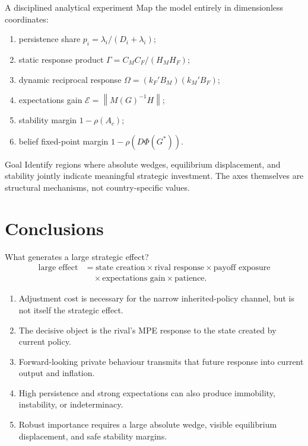 \documentclass[10pt,aspectratio=169]{beamer}
\newcommand{\norm}[1]{\left\lVert#1\right\rVert}
\begin{document}
\begin{frame}{A disciplined analytical experiment}
Map the model entirely in dimensionless coordinates:
\begin{enumerate}
  \item persistence share $p_i=\lambda_i/(D_i+\lambda_i)$;
  \item static response product $\Gamma=C_MC_F/(H_MH_F)$;
  \item dynamic reciprocal response $\Omega=(k_F'B_M)(k_M'B_F)$;
  \item expectations gain $\mathcal E=\norm{M(G)^{-1}H}$;
  \item stability margin $1-\rho(A_c)$;
  \item belief fixed-point margin $1-\rho(D\Phi(G^*))$.
\end{enumerate}
\begin{exampleblock}{Goal}
Identify regions where absolute wedges, equilibrium displacement, and stability
jointly indicate meaningful strategic investment. The axes themselves are
structural mechanisms, not country-specific values.
\end{exampleblock}
\end{frame}

\section{Conclusions}

\begin{frame}{What generates a large strategic effect?}
\begin{equation*}
\boxed{
\begin{aligned}
\text{large effect}
&=\text{state creation}\times\text{rival response}\times\text{payoff exposure}\\
&\quad\times\text{expectations gain}\times\text{patience}.
\end{aligned}}
\end{equation*}
\begin{enumerate}
  \item Adjustment cost is necessary for the narrow inherited-policy channel,
        but is not itself the strategic effect.
  \item The decisive object is the rival's MPE response to the state created by
        current policy.
  \item Forward-looking private behaviour transmits that future response into
        current output and inflation.
  \item High persistence and strong expectations can also produce immobility,
        instability, or indeterminacy.
  \item Robust importance requires a large absolute wedge, visible equilibrium
        displacement, and safe stability margins.
\end{enumerate}
\end{frame}
\end{document}

